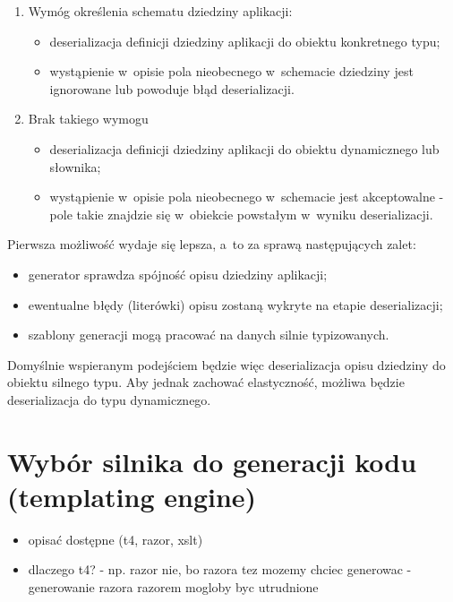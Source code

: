 \begin{enumerate}
 \item Wymóg określenia schematu dziedziny aplikacji:
  \begin{itemize}
   \item deserializacja definicji dziedziny aplikacji do obiektu konkretnego typu;
   \item wystąpienie w~opisie pola nieobecnego w~schemacie dziedziny jest ignorowane lub powoduje błąd deserializacji.
  \end{itemize}
 \item Brak takiego wymogu
  \begin{itemize}
   \item deserializacja definicji dziedziny aplikacji do obiektu dynamicznego lub słownika;
   \item wystąpienie w~opisie pola nieobecnego w~schemacie jest akceptowalne - pole takie znajdzie się w~obiekcie powstałym w~wyniku deserializacji.
  \end{itemize}

\end{enumerate}

Pierwsza możliwość wydaje się lepsza, a~to za sprawą następujących zalet:

\begin{itemize}
 \item generator sprawdza spójność opisu dziedziny aplikacji;
 \item ewentualne błędy (literówki) opisu zostaną wykryte na etapie deserializacji;
 \item szablony generacji mogą pracować na danych silnie typizowanych.
\end{itemize}

Domyślnie wspieranym podejściem będzie więc deserializacja opisu dziedziny do obiektu silnego typu.
Aby jednak zachować elastyczność, możliwa będzie deserializacja do typu dynamicznego.



\section{Wybór silnika do generacji kodu (templating engine)} \label{sec:core:templating_engine}

\begin{itemize}
 \item opisać dostępne (t4, razor, xslt)
 \item dlaczego t4? - np. razor nie, bo razora tez mozemy chciec generowac - generowanie razora razorem mogloby byc utrudnione
\end{itemize}

